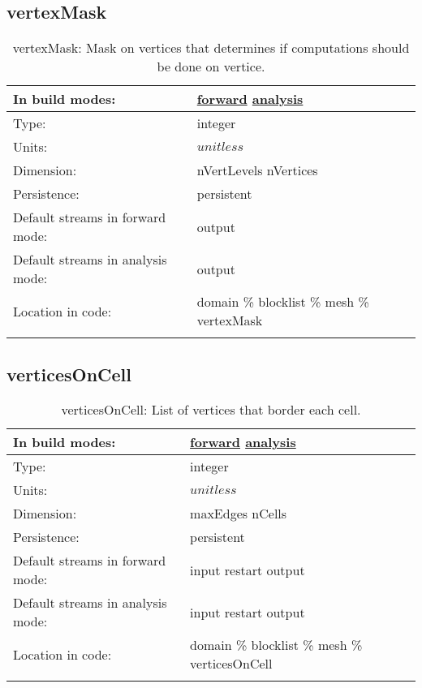 \subsection[vertexMask]{vertexMask}
\label{subsec:var_sec_mesh_vertexMask}
\begin{center}
\begin{longtable}{| p{2.0in} | p{4.0in} |}
        \hline 
        In build modes: & \hyperref[subsec:forward_var_tab_mesh]{forward} \hyperref[subsec:analysis_var_tab_mesh]{analysis} \\
        \hline 
        Type: & integer \\
        \hline 
        Units: & $unitless$ \\
        \hline 
        Dimension: & nVertLevels nVertices \\
        \hline 
        Persistence: & persistent \\
        \hline 
		 Default streams in forward mode: &  output \\
        \hline 
		 Default streams in analysis mode: &  output \\
        \hline 
		 Location in code: & domain \% blocklist \% mesh \% vertexMask \\
		 \hline 
    \caption{vertexMask: Mask on vertices that determines if computations should be done on vertice.}
\end{longtable}
\end{center}
\subsection[verticesOnCell]{verticesOnCell}
\label{subsec:var_sec_mesh_verticesOnCell}
\begin{center}
\begin{longtable}{| p{2.0in} | p{4.0in} |}
        \hline 
        In build modes: & \hyperref[subsec:forward_var_tab_mesh]{forward} \hyperref[subsec:analysis_var_tab_mesh]{analysis} \\
        \hline 
        Type: & integer \\
        \hline 
        Units: & $unitless$ \\
        \hline 
        Dimension: & maxEdges nCells \\
        \hline 
        Persistence: & persistent \\
        \hline 
		 Default streams in forward mode: &  input restart output \\
        \hline 
		 Default streams in analysis mode: &  input restart output \\
        \hline 
		 Location in code: & domain \% blocklist \% mesh \% verticesOnCell \\
		 \hline 
    \caption{verticesOnCell: List of vertices that border each cell.}
\end{longtable}
\end{center}
